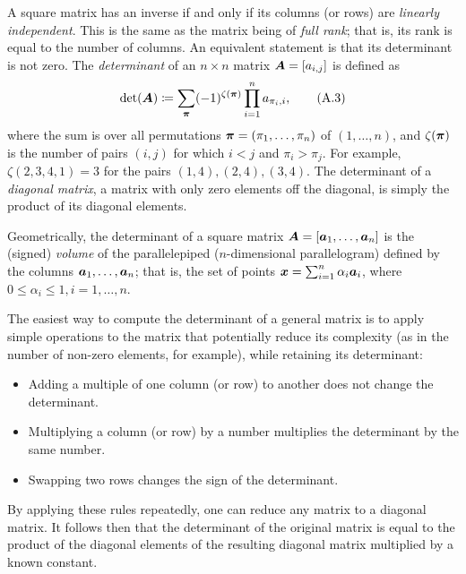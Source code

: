 A square matrix has an inverse if and only if its columns (or rows) are \textit{linearly independent}. This is the same as the matrix being of \textit{full rank}; that is, its rank is equal to the number of columns. An equivalent statement is that its determinant is not zero. The \textit{determinant} of an \(n \times n\) matrix \(\boldsymbol{A} = [a_{i,j}]\) is defined as
\begin{equation}
	\det(\boldsymbol{A}) \coloneqq \sum_{\boldsymbol{\pi}} (-1)^{\zeta(\boldsymbol{\pi})} \prod_{i=1}^n a_{\pi_i, i}, \tag{A.3}
\end{equation}
where the sum is over all permutations \(\boldsymbol{\pi} = (\pi_1, \dots, \pi_n)\) of \((1, \dots, n)\), and \(\zeta(\boldsymbol{\pi})\) is the number of pairs \((i, j)\) for which \(i < j\) and \(\pi_i > \pi_j\). For example, \(\zeta(2, 3, 4, 1) = 3\) for the pairs \((1, 4), (2, 4), (3, 4)\). The determinant of a \textit{diagonal matrix}, a matrix with only zero elements off the diagonal, is simply the product of its diagonal elements.

Geometrically, the determinant of a square matrix \(\boldsymbol{A} = [\boldsymbol{a}_1, \dots, \boldsymbol{a}_n]\) is the (signed) \textit{volume} of the parallelepiped (\(n\)-dimensional parallelogram) defined by the columns \(\boldsymbol{a}_1, \dots, \boldsymbol{a}_n\); that is, the set of points \(\boldsymbol{x} = \sum_{i=1}^n \alpha_i \boldsymbol{a}_i\), where \(0 \le \alpha_i \le 1, i = 1, \dots, n\).

The easiest way to compute the determinant of a general matrix is to apply simple operations to the matrix that potentially reduce its complexity (as in the number of non-zero elements, for example), while retaining its determinant:

\begin{itemize}
	\item Adding a multiple of one column (or row) to another does not change the determinant.
	\item Multiplying a column (or row) by a number multiplies the determinant by the same number.
	\item Swapping two rows changes the sign of the determinant.
\end{itemize}

By applying these rules repeatedly, one can reduce any matrix to a diagonal matrix. It follows then that the determinant of the original matrix is equal to the product of the diagonal elements of the resulting diagonal matrix multiplied by a known constant.

